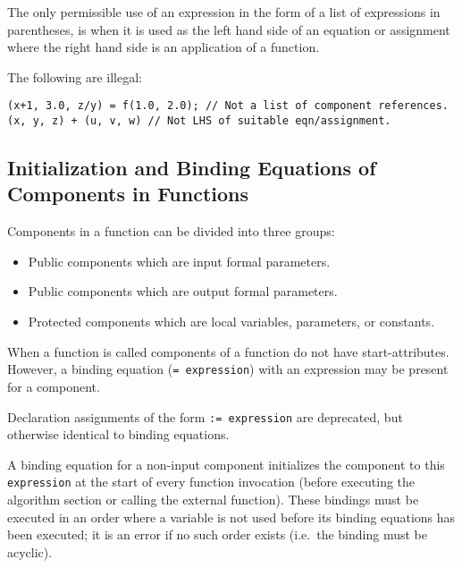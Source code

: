 The only permissible use of an expression in the form of a list of
expressions in parentheses, is when it is used as the left hand side of
an equation or assignment where the right hand side is an application of
a function.

\begin{example}
The following are illegal:
\begin{lstlisting}[language=modelica]
(x+1, 3.0, z/y) = f(1.0, 2.0); // Not a list of component references.
(x, y, z) + (u, v, w) // Not LHS of suitable eqn/assignment.
\end{lstlisting}
\end{example}

\subsection{Initialization and Binding Equations of Components in Functions}
\label{initialization-and-binding-equations-of-components-in-functions}
\label{initialization-and-declaration-assignments-of-components-in-functions}

Components in a function can be divided into three groups:
\begin{itemize}
\item
  Public components which are input formal parameters.
\item
  Public components which are output formal parameters.
\item
  Protected components which are local variables, parameters, or
  constants.
\end{itemize}

When a function is called components of a function do not have
start-attributes. However, a binding equation (\lstinline!= expression!) with
an expression may be present for a component.
\begin{nonnormative}
Declaration assignments of the form \lstinline!:= expression! are deprecated, but otherwise identical to binding equations.
\end{nonnormative}

A binding equation for a non-input component initializes the
component to this \lstinline!expression! at the start of every function invocation
(before executing the algorithm section or calling the external
function). These bindings must be executed in an order where a variable
is not used before its binding equations has been executed; it is
an error if no such order exists (i.e.\ the binding must be acyclic).

